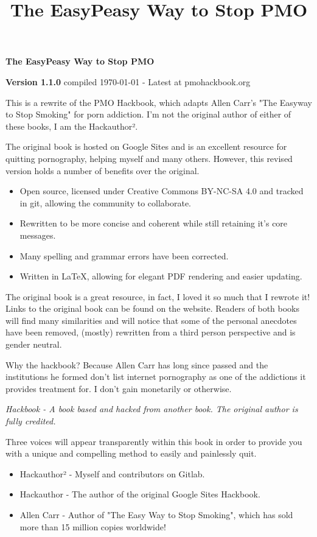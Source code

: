 \documentclass[easypeasy.tex]{subfiles}
\title {The EasyPeasy Way to Stop PMO}
\begin{document}
\thispagestyle{empty}

\begin{center}
  {\Huge\bfseries The EasyPeasy Way to Stop PMO \par}
  {\small \textbf{Version 1.1.0} compiled {\today} - Latest at pmohackbook.org}
\end{center}

This is a rewrite of the PMO Hackbook, which adapts Allen Carr's "The Easyway to Stop Smoking" for porn addiction. I'm not the original author of either of these books, I am the Hackauthor².

The original book is hosted on Google Sites and is an excellent resource for quitting pornography, helping myself and many others. However, this revised version holds a number of benefits over the original.
\begin{itemize}
\item Open source, licensed under Creative Commons BY-NC-SA 4.0 and tracked in git, allowing the community to collaborate.
\item Rewritten to be more concise and coherent while still retaining it's core messages.
\item Many spelling and grammar errors have been corrected.
\item Written in LaTeX, allowing for elegant PDF rendering and easier updating.
\end{itemize}

The original book is a great resource, in fact, I loved it so much that I rewrote it! Links to the original book can be found on the website. Readers of both books will find many similarities and will notice that some of the personal anecdotes have been removed, (mostly) rewritten from a third person perspective and is gender neutral.

Why the hackbook? Because Allen Carr has long since passed and the institutions he formed don't list internet pornography as one of the addictions it provides treatment for. I don't gain monetarily or otherwise.

\textit{{\small Hackbook - A book based and hacked from another book. The original author is fully credited.}}

Three voices will appear transparently within this book in order to provide you with a unique and compelling method to easily and painlessly quit.
\begin{itemize}
  \item Hackauthor² - Myself and contributors on Gitlab.
  \item Hackauthor - The author of the original Google Sites Hackbook.
  \item Allen Carr - Author of "The Easy Way to Stop Smoking", which has sold more than 15 million copies worldwide!
\end{itemize}
\end{document}
